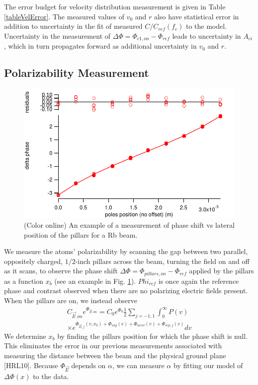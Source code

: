 \documentclass[twocolumn, prl,showpacs,superscriptaddress]{revtex4-1}   %
\newcommand{\figref}[1]{Fig. \ref{#1}}
\begin{document}
The error budget for velocity distribution measurement is given in Table \ref{tableVelError}. The measured values of $v_0$ and $r$ also have statistical error in addition to uncertainty in the fit of measured $C/C_{ref}(f_c)$ to the model. Uncertainty in the measurement of $\Delta\Phi = \Phi_{c1,on} - \Phi_{ref}$ leads to uncertainty in $A_{ci}$, which in turn propagates forward as additional uncertainty in $v_0$ and $r$.

\subsection{Polarizability Measurement}

\begin{figure}
\includegraphics[width=\linewidth,keepaspectratio]{dPvMP_150327_q.pdf}
\caption{\label{dPvMPExample}(Color online) An example of a measurement of phase shift vs lateral position of the pillars for a Rb beam.}
\end{figure}

We measure the atoms' polarizability by scanning the gap between two parallel, oppositely charged, $1/2$-inch pillars across the beam, turning the field on and off as it scans, to observe the phase shift $\Delta\Phi = \Phi_{pillars,on} - \Phi_{ref}$ applied by the pillars as a function $x_b$ (see an example in \figref{dPvMPExample}). $Phi_{ref}$ is once again the reference phase and contrast observed when there are no polarizing electric fields present.
When the pillars are on, we instead observe
\begin{align}
	C_{\vec{E}\textit{ on}}e^{\Phi_{\vec{E}\textit{ on}}} = 
		C_0e^{\Phi_0}		
		\frac{1}{2} \sum_{j=-1,1}
		\int_0^{\infty} P(v) \nonumber \\ \times
		e^{
			\Phi_{\vec{E},j}(v,x_b) + 
			\Phi_{sag}(v) + \Phi_{accel}(v) + \Phi_{sep,j}(v)
		} 
		dv
	\label{CPPolesEOn}
\end{align}
We determine $x_b$ by finding the pillars position for which the phase shift is null. This eliminates the error in our previous measurements associated with measuring the distance between the beam and the physical ground plane [HRL10].
Because $\Phi_{\vec{E}}$ depends on $\alpha$, we can measure $\alpha$ by fitting our model of $\Delta\Phi(x)$ to the data.
\end{document}
